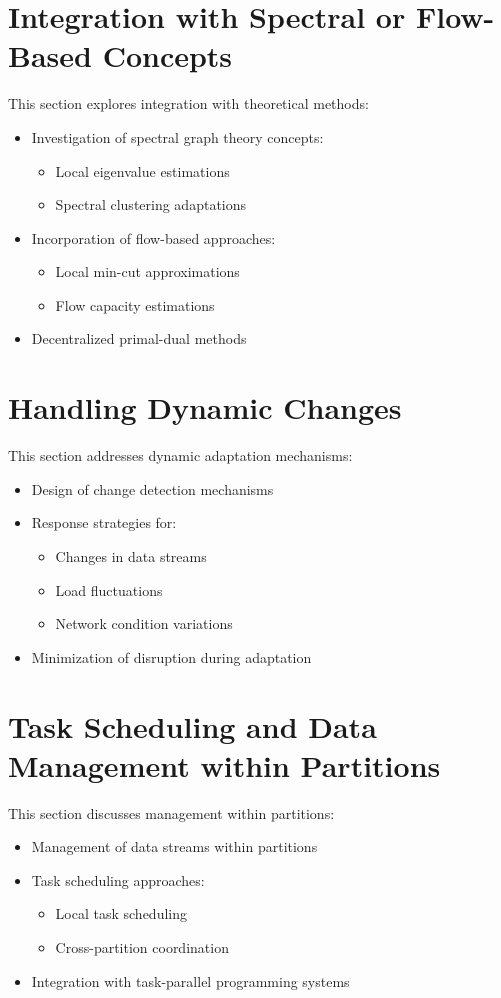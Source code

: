 \section{Integration with Spectral or Flow-Based Concepts}
This section explores integration with theoretical methods:
\begin{itemize}
    \item Investigation of spectral graph theory concepts:
        \begin{itemize}
            \item Local eigenvalue estimations
            \item Spectral clustering adaptations
        \end{itemize}
    \item Incorporation of flow-based approaches:
        \begin{itemize}
            \item Local min-cut approximations
            \item Flow capacity estimations
        \end{itemize}
    \item Decentralized primal-dual methods
\end{itemize}

\section{Handling Dynamic Changes}
This section addresses dynamic adaptation mechanisms:
\begin{itemize}
    \item Design of change detection mechanisms
    \item Response strategies for:
        \begin{itemize}
            \item Changes in data streams
            \item Load fluctuations
            \item Network condition variations
        \end{itemize}
    \item Minimization of disruption during adaptation
\end{itemize}

\section{Task Scheduling and Data Management within Partitions}
This section discusses management within partitions:
\begin{itemize}
    \item Management of data streams within partitions
    \item Task scheduling approaches:
        \begin{itemize}
            \item Local task scheduling
            \item Cross-partition coordination
        \end{itemize}
    \item Integration with task-parallel programming systems
\end{itemize}
